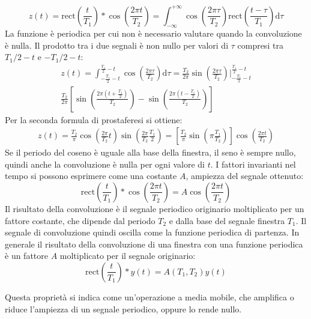 \documentclass{article}
\newcommand{\rect}{\mathrm{rect}}
\newcommand{\df}{\mathrm{d}}
\numberwithin{equation}{subsection}
\begin{document}
\begin{equation*}
    z(t)=\rect\displaystyle\left(\frac{t}{T_1}\right)*\cos\left(\frac{2\pi t}{T_2}\right)=\int_{-\infty}^{+\infty}\cos\left(\frac{2\pi \tau}{T_2}\right)\rect\displaystyle\left(\frac{t-\tau}{T_1}\right)\df\tau
\end{equation*}
La funzione è periodica per cui non è necessario valutare quando la convoluzione è nulla. Il prodotto tra i due segnali è non nullo per valori di $\tau$ compresi tra 
$T_1/2-t$ e $-T_1/2-t$:
\begin{gather*}
    z(t)=\displaystyle\int_{-\frac{T_1}{2}-t}^{\frac{T_1}{2}-t}\cos\left(\frac{2\pi\tau}{T_2}\right)\df\tau=\frac{T_2}{2\pi}\sin\left(\frac{2\pi\tau}{T_2}\right)\Bigg|_{-\frac{T_1}{2}-t}^{\frac{T_1}{2}-t}\\
    \displaystyle\frac{T_2}{2\pi}\left[\sin\left(\frac{2\pi(t+\frac{T_1}{2})}{T_2}\right)-\sin\left(\frac{2\pi(t-\frac{T_1}{2})}{T_2}\right)\right]
\end{gather*}
Per la seconda formula di prostaferesi si ottiene:
\begin{gather*}
    z(t)=\displaystyle\frac{T_2}{\pi}\cos\left(\frac{2\pi}{T_2}t\right)\sin\left(\frac{2\pi}{T_2}\frac{T_1}{2}\right)=\left[\frac{T_2}{\pi}\sin\left(\pi\frac{T_1}{T_2}\right)\right]\cos\left(\frac{2\pi t}{T_2}\right)
\end{gather*}
Se il periodo del coseno è uguale alla base della finestra, il seno è sempre nullo, quindi anche la convoluzione è nulla per ogni valore di $t$. I fattori invarianti nel 
tempo si possono esprimere come una costante $A$, ampiezza del segnale ottenuto:
\begin{equation*}
    \rect\left(\displaystyle\frac{t}{T_1}\right)*\cos\left(\frac{2\pi t}{T_2}\right)=A\cos\left(\frac{2\pi t}{T_2}\right)
\end{equation*}  
Il risultato della convoluzione è il segnale periodico originario moltiplicato per un fattore costante, che dipende dal periodo $T_2$ e dalla base del segnale finestra $T_1$. 
Il segnale di convoluzione quindi oscilla come la funzione periodica di partenza. In generale il risultato della convoluzione di una finestra con una funzione periodica è un fattore 
$A$ moltiplicato per il segnale originario:
\begin{equation}
    \rect\left(\frac{t}{T_1}\right)*y(t)=A(T_1,T_2)y(t)
\end{equation}

Questa proprietà si indica come un'operazione a media mobile, che amplifica o riduce l'ampiezza di un segnale periodico, oppure lo rende nullo. 
\end{document}
